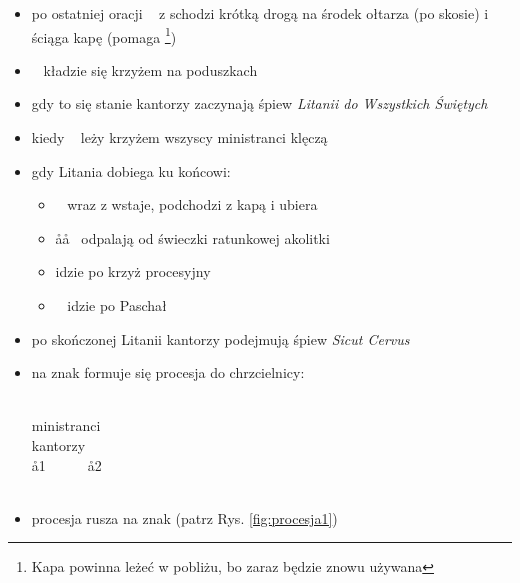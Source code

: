 \begin{itemize}
	\item po ostatniej oracji \ii~ z  schodzi krótką drogą na środek ołtarza
	      (po skosie) i ściąga kapę (pomaga  \footnote{Kapa powinna leżeć w
		      pobliżu, bo zaraz będzie znowu używana})
	\item \ii~ kładzie się krzyżem na poduszkach
	\item gdy to się stanie kantorzy zaczynają śpiew
	      \textit{Litanii do Wszystkich Świętych}
	\item kiedy \ii~ leży krzyżem wszyscy ministranci klęczą
	\item gdy Litania dobiega ku końcowi:
	      \begin{itemize}
		      \item \ii~ wraz z  wstaje,  podchodzi z kapą i ubiera \ii
		      \item \aa\aa~ odpalają od świeczki ratunkowej akolitki
		      \item {} idzie po krzyż procesyjny
		      \item \paschal~ idzie po Paschał
	      \end{itemize}
	\item po skończonej Litanii kantorzy podejmują śpiew \textit{Sicut Cervus}
	\item na znak  formuje się procesja do chrzcielnicy:
	      \begin{center}
		      ~~~\ii~~~ \smallskip\\
		      ministranci \smallskip\\
		      kantorzy \smallskip\\
		      \aa1~~~~~~\aa2 \smallskip\\
		      ~~\paschal~~~~~~~ \smallskip\\
		      \downarrow
	      \end{center}
	\item procesja rusza na znak  (patrz Rys. \ref{fig:procesja1})
\end{itemize}
